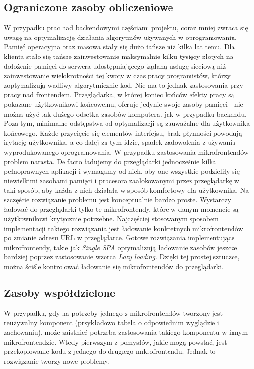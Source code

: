 \documentclass{SGGW-thesis}
\begin{document}
    \subsection{Ograniczone zasoby obliczeniowe}
    W przypadku prac nad backendowymi częściami projektu, coraz mniej zwraca się uwagę na optymalizację działania algorytmów używanych w oprogramowaniu. Pamięć operacyjna oraz masowa stały się dużo tańsze niż kilka lat temu. Dla klienta stało się tańsze zainwestowanie maksymalnie kilku tysięcy złotych na dołożenie pamięci do serwera udostępniającego żądaną usługę sieciową niż zainwestowanie wielokrotności tej kwoty w czas pracy programistów, którzy zoptymalizują wadliwy algorytmicznie kod.
    Nie ma to jednak zastosowania przy pracy nad frontendem. Przeglądarka, w której koniec końców efekty pracy są pokazane użytkownikowi końcowemu, oferuje jedynie swoje zasoby pamięci - nie można użyć tak dużego odsetka zasobów komputera, jak w przypadku backendu. Poza tym, minimalne odstępstwa od optymalizacji są zauważalne dla użytkownika końcowego. Każde przycięcie się elementów interfejsu, brak płynności powodują irytację użytkownika, a co dalej za tym idzie, spadek zadowolenia z używania wyprodukowanego oprogramowania. W przypadku zastosowania mikrofrontendów problem narasta. De facto ładujemy do przeglądarki jednocześnie kilka pełnoprawnych aplikacji i wymagamy od nich, aby one wszystkie podzieliły się niewielkimi zasobami pamięci i procesora zaalokowanymi przez przeglądarkę w taki sposób, aby każda z nich działała w sposób komfortowy dla użytkownika. Na szczęście rozwiązanie problemu jest konceptualnie bardzo proste. Wystarczy ładować do przeglądarki tylko te mikrofrontendy, które w danym momencie są użytkownikowi krytycznie potrzebne. Najczęściej stosowanym sposobem implementacji takiego rozwiązania jest ładowanie konkretnych mikrofrontendów po zmianie adresu URL w przeglądarce. Gotowe rozwiązania implementujące mikrofrontendy, takie jak \textit{Single SPA} optymalizują ładowanie zasobów jeszcze bardziej poprzez zastosowanie wzorca \textit{Lazy loading}. Dzięki tej prostej sztuczce, można ściśle kontrolować ładowanie się mikrofrontendów do przeglądarki.

    \subsection{Zasoby współdzielone}
    W przypadku, gdy na potrzeby jednego z mikrofrontendów tworzony jest reużywalny komponent (przykładowo tabela o odpowiednim wyglądzie i zachowaniu), może zaistnieć potrzeba zastosowania takiego komponentu w innym mikrofrontendzie. Wtedy pierwszym z pomysłów, jakie mogą powstać, jest przekopiowanie kodu z jednego do drugiego mikrofrontendu. Jednak to rozwiązanie tworzy nowe problemy. 
    
\end{document}
